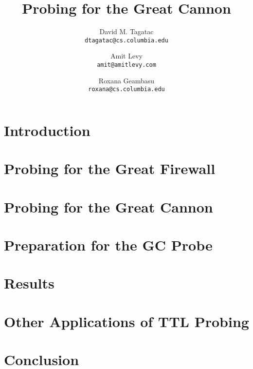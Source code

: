 \documentclass[10pt,twocolumn]{article}
\begin{document}
\title{\bf Probing for the Great Cannon}
\author{
	David M. Tagatac\\
	\texttt{dtagatac@cs.columbia.edu}
	\and
	Amit Levy\\
	\texttt{amit@amitlevy.com}
	\and
	Roxana Geambasu\\
	\texttt{roxana@cs.columbia.edu}
}
\date{}
\maketitle
\thispagestyle{empty}

%

\section{Introduction}


\section{Probing for the Great Firewall}


\section{Probing for the Great Cannon}


\section{Preparation for the GC Probe}


\section{Results}


\section{Other Applications of TTL Probing}


\section{Conclusion}


{\footnotesize 
}
\end{document}
